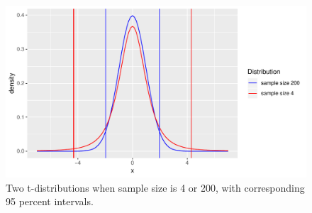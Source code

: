 \documentclass[]{report}\usepackage[]{graphicx}\usepackage[]{color}
\makeatletter
\def\maxwidth{ %
  \ifdim\Gin@nat@width>\linewidth
    \linewidth
  \else
    \Gin@nat@width
  \fi
}
\newenvironment{knitrout}{}{} %
\makeatother
\begin{document}



\begin{knitrout}
\color{fgcolor}\begin{figure}

{\centering \includegraphics[width=\maxwidth]{figure/inf_10-1} 

}

\caption[Two t-distributions when sample size is 4 or 200, with corresponding 95 percent intervals]{Two t-distributions when sample size is 4 or 200, with corresponding 95 percent intervals.}\label{fig:inf_10}
\end{figure}


\end{knitrout}
\end{document}
